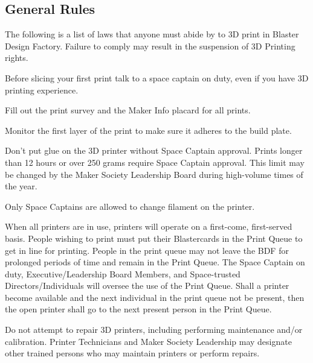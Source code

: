 \documentclass[12pt,letterpaper]{article}
\newcommand{\bremove}[1]{
    {\color{red}#1}
}
\newcommand{\badd}[1]{
    {\color{darkgreen}#1}
}
\begin{document}
\badd{\subsection{General Rules}}

The following is a list of laws that anyone must abide by to 3D print in Blaster Design Factory. Failure to comply may result in the suspension of 3D Printing rights. 

\begin{enumerate}
    \item Before slicing your first print talk to a space captain on duty, even if you have 3D printing experience. 
    \item Fill out the print survey and the Maker Info placard for all prints. 
    \item Monitor the first layer of the print to make sure it adheres to the build plate. 
    \bremove{\item Don’t put glue on the 3D printer without Space Captain approval. 
    Prints longer than 12 hours or over 250 grams require Space Captain approval. This limit may be changed by the Maker Society Leadership Board during high-volume times of the year.
    \item Only Space Captains are allowed to change filament on the printer.}

    \badd{\item When all printers are in use, printers will operate on a first-come, first-served basis. People wishing to print must put their Blastercards in the Print Queue to get in line for printing. People in the print queue may not leave the BDF for prolonged periods of time and remain in the Print Queue. The Space Captain on duty, Executive/Leadership Board Members, and Space-trusted Directors/Individuals will oversee the use of the Print Queue. Shall a printer become available and the next individual in the print queue not be present, then the open printer shall go to the next present person in the Print Queue.}
    
    \item Do not attempt to repair 3D printers, including performing maintenance and/or calibration. Printer Technicians and Maker Society Leadership may designate other trained persons who may maintain printers or perform repairs.
    

\end{enumerate}
\end{document}
